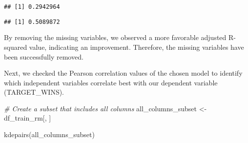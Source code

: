 \documentclass[
]{article}
\newenvironment{Shaded}{\begin{snugshade}}{\end{snugshade}}
\newcommand{\AttributeTok}[1]{\textcolor[rgb]{0.77,0.63,0.00}{#1}}
\newcommand{\CommentTok}[1]{\textcolor[rgb]{0.56,0.35,0.01}{\textit{#1}}}
\newcommand{\FunctionTok}[1]{\textcolor[rgb]{0.00,0.00,0.00}{#1}}
\newcommand{\NormalTok}[1]{#1}
\newcommand{\OtherTok}[1]{\textcolor[rgb]{0.56,0.35,0.01}{#1}}
\newcommand{\SpecialCharTok}[1]{\textcolor[rgb]{0.00,0.00,0.00}{#1}}
\begin{document}
\begin{verbatim}
## [1] 0.2942964
\end{verbatim}

\begin{Shaded}
\end{Shaded}

\begin{verbatim}
## [1] 0.5089872
\end{verbatim}

By removing the missing variables, we observed a more favorable adjusted
R-squared value, indicating an improvement. Therefore, the missing
variables have been successfully removed.

Next, we checked the Pearson correlation values of the chosen model to
identify which independent variables correlate best with our dependent
variable (TARGET\_WINS).

\begin{Shaded}
\begin{Highlighting}[]
\CommentTok{\# Create a subset that includes all columns}
\NormalTok{all\_columns\_subset }\OtherTok{\textless{}{-}}\NormalTok{ df\_train\_rm[, ]}

\FunctionTok{kdepairs}\NormalTok{(all\_columns\_subset)}
\end{Highlighting}
\end{Shaded}
\end{document}
